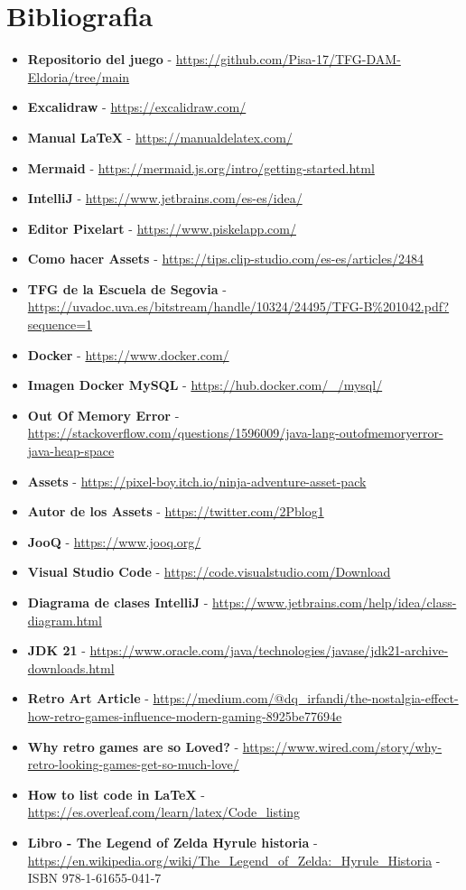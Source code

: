 \documentclass[a4paper]{article}
\begin{document}
\section{Bibliografia}
\begin{itemize}
    \item \textbf{Repositorio del juego} - \url{https://github.com/Pisa-17/TFG-DAM-Eldoria/tree/main}
    \item \textbf{Excalidraw} - \url{https://excalidraw.com/}
    \item \textbf{Manual LaTeX} - \url{https://manualdelatex.com/}
    \item \textbf{Mermaid} - \url{https://mermaid.js.org/intro/getting-started.html}
    \item \textbf{IntelliJ} - \url{https://www.jetbrains.com/es-es/idea/}
    \item \textbf{Editor Pixelart} - \url{https://www.piskelapp.com/}
    \item \textbf{Como hacer Assets} - \url{https://tips.clip-studio.com/es-es/articles/2484}
    \item \textbf{TFG de la Escuela de Segovia} - \url{https://uvadoc.uva.es/bitstream/handle/10324/24495/TFG-B%201042.pdf?sequence=1}
    \item \textbf{Docker} - \url{https://www.docker.com/}
    \item \textbf{Imagen Docker MySQL} - \url{https://hub.docker.com/_/mysql/}
    \item \textbf{Out Of Memory Error} - \url{https://stackoverflow.com/questions/1596009/java-lang-outofmemoryerror-java-heap-space}
    \item \textbf{Assets} - \url{https://pixel-boy.itch.io/ninja-adventure-asset-pack}
    \item \textbf{Autor de los Assets} - \url{https://twitter.com/2Pblog1}
    \item \textbf{JooQ} - \url{https://www.jooq.org/}
    \item \textbf{Visual Studio Code} - \url{https://code.visualstudio.com/Download}
    \item \textbf{Diagrama de clases IntelliJ} - \url{https://www.jetbrains.com/help/idea/class-diagram.html}
    \item \textbf{JDK 21} - \url{https://www.oracle.com/java/technologies/javase/jdk21-archive-downloads.html}
    \item \textbf{Retro Art Article} - \url{https://medium.com/@dq_irfandi/the-nostalgia-effect-how-retro-games-influence-modern-gaming-8925be77694e}
    \item \textbf{Why retro games are so Loved?} - \url{https://www.wired.com/story/why-retro-looking-games-get-so-much-love/}
    \item \textbf{How to list code in LaTeX} - \url{https://es.overleaf.com/learn/latex/Code_listing}
    \item \textbf{Libro - The Legend of Zelda Hyrule historia} - \url{https://en.wikipedia.org/wiki/The_Legend_of_Zelda:_Hyrule_Historia} - ISBN 978-1-61655-041-7
\end{itemize}
\end{document}
